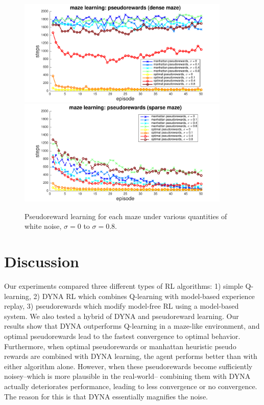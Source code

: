 \documentclass[notitlepage]{article}
\begin{document}
\begin{figure}[ht]
\includegraphics[width=0.9\textwidth]{PRdenseCompare}
\includegraphics[width=0.9\textwidth]{PRsparseCompare}
\caption{Pseudoreward learning for each maze under various quantities of white noise, $\sigma = 0$ to $\sigma = 0.8$.}
\label{fig:sigma-compare}
\end{figure}

\section*{Discussion}

Our experiments compared three different types of RL algorithms: 1) simple Q-learning, 2) DYNA RL which combines Q-learning with model-based experience replay, 3) pseudorewards which modify model-free RL using a model-based system. We also tested a hybrid of DYNA and pseudoreward learning. Our results show that DYNA outperforms Q-learning in a maze-like environment, and optimal pseudorewards lead to the fastest convergence to optimal behavior. Furthermore, when optimal pseudorewards or manhattan heuristic pseudo rewards are combined with DYNA learning, the agent performs better than with either algorithm alone. However, when these pseudorewards become sufficiently noisey--which is more plausible in the real-world-- combining them with DYNA actually deteriorates performance, leading to less convergence or no convergence. The reason for this is that DYNA essentially magnifies the noise.
\end{document}
